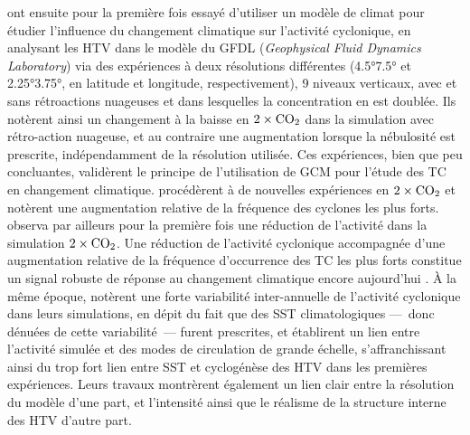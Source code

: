 \documentclass[../main.tex]{subfiles}
\begin{document}
\cite{broccoli_can_1990} ont ensuite pour la première fois essayé d'utiliser un modèle de climat pour étudier l'influence du changement climatique sur
l'activité cyclonique, en analysant les HTV dans le modèle du GFDL (\textit{Geophysical Fluid Dynamics Laboratory}) via des expériences à deux résolutions
différentes (\ang{4.5}\times\ang{7.5} et \ang{2.25}\times\ang{3.75}, en latitude et longitude, respectivement), \num{9} niveaux verticaux, avec et sans
rétroactions nuageuses et dans lesquelles la concentration en  est doublée. Ils notèrent ainsi un changement à la baisse en
\ensuremath{2\times\ce{CO2}} dans la simulation avec rétro-action nuageuse, et au contraire une augmentation lorsque la nébulosité est prescrite, indépendamment
de la résolution utilisée. Ces expériences, bien que peu concluantes, validèrent le principe de l'utilisation de GCM pour l'étude des TC en changement
climatique. \cite{haarsma_tropical_1993,bengtsson_will_1996} procédèrent à de nouvelles expériences en \ensuremath{2\times\ce{CO2}} et notèrent une augmentation
relative de la fréquence des cyclones les plus forts. \cite{bengtsson_will_1996} observa par ailleurs pour la première fois une réduction de l'activité dans la
simulation \ensuremath{2\times\ce{CO2}}. Une réduction de l'activité cyclonique accompagnée d'une augmentation relative de la fréquence d'occurrence des TC les
plus forts constitue un signal robuste de réponse au changement climatique encore aujourd'hui \parencite[][voir
\cref{sec:projections_futures}]{walsh_tropical_2016,camargo_tropical_2016,knutson_tropical_2010,knutson_tropical_2010,seneviratne_weather_2021}. À la même
époque, \cite{bengtsson_hurricanetype_1995} notèrent une forte variabilité inter-annuelle de l'activité cyclonique dans leurs simulations, en dépit du fait que
des SST climatologiques ---~donc dénuées de cette variabilité~--- furent prescrites, et établirent un lien entre l'activité simulée et des modes de circulation
de grande échelle, s'affranchissant ainsi du trop fort lien entre SST et cyclogénèse des HTV dans les premières expériences. Leurs travaux montrèrent également
un lien clair entre la résolution du modèle d'une part, et l'intensité ainsi que le réalisme de la structure interne des HTV d'autre part.
\end{document}
